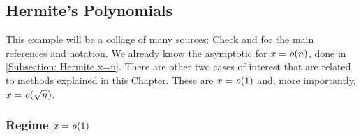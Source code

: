  \subsection{Hermite's Polynomials}

This example will be a collage of many sources: Check \cite{shi2021errorboundsasymptoticexpansions} and \cite{nica2025gaussianintegralformulahermite} for the main references and notation. We already know the asymptotic for $x = \mathit{o}(n)$, done in \ref{Subsection: Hermite x=n}. There are other two cases of interest that are related to methods explained in this Chapter. These are $x=\mathit{o}(1)$ and, more importantly, $x = \mathit{o}(\sqrt{n})$.

\subsubsection{Regime $x = \mathit{o}(1)$}
\label{SubSection: Hermite x=o(1)}

